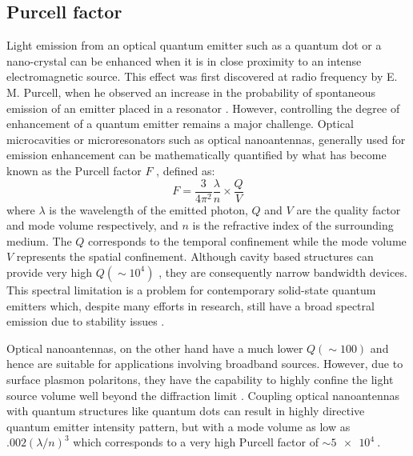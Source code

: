 \subsection{Purcell factor}
%
Light emission from an optical quantum emitter such as a quantum dot or a nano-crystal can be enhanced when it is in close proximity to an intense electromagnetic source. This effect was first discovered at radio frequency by E. M. Purcell, when he observed an increase in the probability of spontaneous emission of an emitter placed in a resonator \cite{Purcell1946}. However, controlling the degree of enhancement of a quantum emitter remains a major challenge. Optical microcavities or microresonators such as optical nanoantennas, generally used for emission enhancement can be mathematically quantified by what has become known as the Purcell factor $F$ \cite{Vahala2003}, defined as:
%
\begin{equation}
  F = \frac{3}{4 \pi^2} \frac{ \lambda}{n} \times \frac{Q}{V}
  \label{eq:purcell}
\end{equation}
%
where $\lambda$ is the wavelength of the emitted photon, $Q$ and $V$ are the quality factor and mode volume respectively, and $n$ is the refractive index of the surrounding medium. The $Q$ corresponds to the temporal confinement while the mode volume $V$ represents the spatial confinement. Although cavity based structures can provide very high $Q (\sim 10^4)$ \cite{Song2005}, they are consequently narrow bandwidth devices. This spectral limitation is a problem for contemporary solid-state quantum emitters which, despite many efforts in research, still have a broad spectral emission due to stability issues \cite{Gaebel2004}.

Optical nanoantennas, on the other hand have a much lower $Q (\sim 100)$ \cite{curtothesis} and hence are suitable for applications involving broadband sources. However, due to surface plasmon polaritons, they have the capability to highly confine the light source volume well beyond the diffraction limit \cite{Maier2006,Barthes2011}. Coupling optical nanoantennas with quantum structures like quantum dots can result in highly directive quantum emitter intensity pattern, but with a mode volume as low as $.002 \left(\lambda/n \right)^3$ \cite{curtothesis} which corresponds to a very high Purcell factor of $\sim \SI{5e4}{}$.
